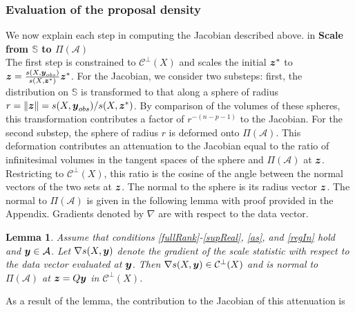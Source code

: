 \documentclass[ba]{imsart}
\newcommand{\by}{\mbox{\boldmath $y$}}
\newcommand{\bz}{\mbox{\boldmath $z$}}
\newcommand{\mc}{\mathcal}
\newtheorem{lemma}[theorem]{\bf Lemma}
\begin{document}
\subsubsection{Evaluation of the proposal density} 
We now explain each step in computing the Jacobian described above.
 in
\noindent
{\bf Scale from $\mathbb{S}$ to $\Pi(\mathcal{A})$} \\
The first step is constrained to $\mc{C}^\perp(X)$  and scales the initial $\bz^{*}$ to $\bz=\frac{s(X,\boldsymbol{y}_{obs})}{s(X, \boldsymbol{z}^{*})}\bz^{*}$. For the Jacobian, we consider two substeps: first, the distribution on  $\mathbb{S}$ is transformed to that along a sphere of radius $r=\|\bz\|={s(X,\boldsymbol{y}_{obs})}/{s(X, \boldsymbol{z}^{*})}$. By comparison of the volumes of these spheres, this transformation contributes a factor of $r^{-(n-p-1)}$ to the Jacobian. For the second substep, the sphere of radius $r$ is deformed onto $\Pi(\mathcal{A})$.  This deformation contributes an attenuation to the Jacobian equal to the ratio of infinitesimal volumes in the tangent spaces of the sphere and $\Pi(\mathcal{A})$ at $\bz$.  
Restricting to $\mc{C}^\perp(X)$, this ratio is the cosine of the angle between the normal 
vectors of the two sets at $\bz$.  The normal to the sphere is its radius vector $\bz$. The normal to
$\Pi(\mathcal{A})$ is given in the following lemma with proof provided in the Appendix.  Gradients denoted by $\nabla$ are with respect to the data vector.
\begin{lemma}
\label{gradSTheoremReg}
Assume that conditions \ref{fullRank}-\ref{supReal}, \ref{as}, and \ref{regIn} hold and $\by\in \mathcal{A}$. Let 
$\nabla s(X,\by)$ denote the
gradient of the scale statistic with respect to the data vector evaluated at
$\by$.  Then $\nabla s(X,\by)\in \mc{C}^\perp(X)$ and is 
normal to $\Pi(\mathcal{A})$ at $\bz=Q\by$  in $\mc{C}^\perp(X)$.
\end{lemma}
As a result of the lemma, the contribution to the Jacobian of this attenuation is 
\end{document}
